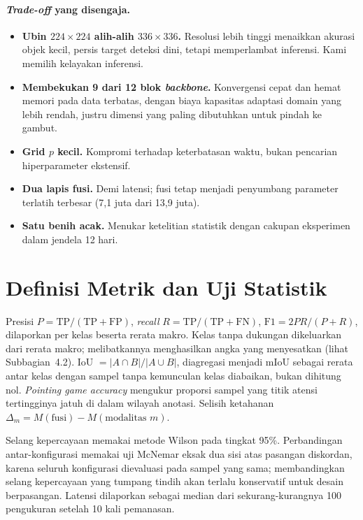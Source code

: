 \paragraph{\emph{Trade-off} yang disengaja.}
\begin{itemize}
\item \textbf{Ubin $224 \times 224$ alih-alih $336 \times 336$.} Resolusi lebih
tinggi menaikkan akurasi objek kecil, persis target deteksi dini, tetapi
memperlambat inferensi. Kami memilih kelayakan inferensi.
\item \textbf{Membekukan 9 dari 12 blok \emph{backbone}.} Konvergensi cepat dan
hemat memori pada data terbatas, dengan biaya kapasitas adaptasi domain yang
lebih rendah, justru dimensi yang paling dibutuhkan untuk pindah ke gambut.
\item \textbf{Grid $p$ kecil.} Kompromi terhadap keterbatasan waktu, bukan
pencarian hiperparameter ekstensif.
\item \textbf{Dua lapis fusi.} Demi latensi; fusi tetap menjadi penyumbang
parameter terlatih terbesar (7,1 juta dari 13,9 juta).
\item \textbf{Satu benih acak.} Menukar ketelitian statistik dengan cakupan
eksperimen dalam jendela 12 hari.
\end{itemize}

\section{Definisi Metrik dan Uji Statistik}
\label{app:metrik}

Presisi $P = \mathrm{TP}/(\mathrm{TP}+\mathrm{FP})$, \emph{recall}
$R = \mathrm{TP}/(\mathrm{TP}+\mathrm{FN})$, $\mathrm{F1} = 2PR/(P+R)$,
dilaporkan per kelas beserta rerata makro. Kelas tanpa dukungan dikeluarkan dari
rerata makro; melibatkannya menghasilkan angka yang menyesatkan (lihat
Subbagian~4.2). IoU $= |A \cap B|/|A \cup B|$, diagregasi menjadi mIoU sebagai
rerata antar kelas dengan sampel tanpa kemunculan kelas diabaikan, bukan
dihitung nol. \emph{Pointing game accuracy} mengukur proporsi sampel yang
titik atensi tertingginya jatuh di dalam wilayah anotasi. Selisih ketahanan
$\Delta_m = M(\text{fusi}) - M(\text{modalitas } m)$.

Selang kepercayaan memakai metode Wilson pada tingkat 95\%. Perbandingan
antar-konfigurasi memakai uji McNemar eksak dua sisi atas pasangan diskordan,
karena seluruh konfigurasi dievaluasi pada sampel yang sama; membandingkan
selang kepercayaan yang tumpang tindih akan terlalu konservatif untuk desain
berpasangan. Latensi dilaporkan sebagai median dari sekurang-kurangnya 100
pengukuran setelah 10 kali pemanasan.

